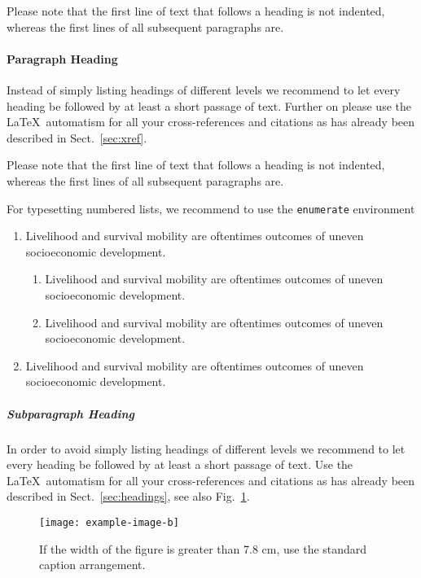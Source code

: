 \documentclass{aip-book}
\theoremstyle{definition}
\begin{document}
Please note that the first line of text that follows a heading is not indented, whereas the first lines of all subsequent paragraphs are.

\paragraph{Paragraph Heading}

Instead of simply listing headings of different levels we recommend to let every heading be followed by at least a short passage of text. 
Further on please use the \LaTeX\ automatism for all your cross-references and citations as has already been described in Sect.~\ref{sec:xref}.

Please note that the first line of text that follows a heading is not indented, whereas the first lines of all subsequent paragraphs are.

For typesetting numbered lists, we recommend to use the \verb+enumerate+ environment 
\begin{enumerate}
  \item Livelihood and survival mobility are oftentimes outcomes of uneven socioeconomic development.
  \begin{enumerate}
    \item Livelihood and survival mobility are oftentimes outcomes of uneven socioeconomic development.
    \item Livelihood and survival mobility are oftentimes outcomes of uneven socioeconomic development.
  \end{enumerate}
  \item Livelihood and survival mobility are oftentimes outcomes of uneven socioeconomic development.
\end{enumerate}

\subparagraph{Subparagraph Heading}

In order to avoid simply listing headings of different levels we recommend to let every heading be followed by at least a short passage of text. 
Use the \LaTeX\ automatism for all your cross-references and citations as has already been described in Sect.~\ref{sec:headings}, see also Fig.~\ref{fig:example}.
\begin{figure}
    \centering
    \texttt{[image: example-image-b]}
    \caption{
      If the width of the figure is greater than 7.8 cm, use the standard caption arrangement.}
    \label{fig:example}
\end{figure}
\end{document}
